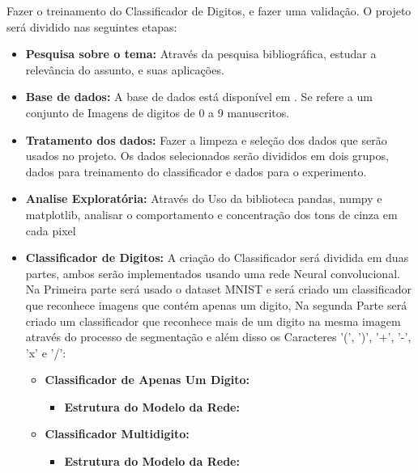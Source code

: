 \documentclass[conference]{IEEEtran}
\begin{document}
Fazer o treinamento do Classificador de Digitos, e fazer uma validação. O projeto será dividido nas seguintes etapas:


\begin{itemize}
\item \textbf{Pesquisa sobre o tema:}
Através da pesquisa bibliográfica, estudar  a relevância do assunto, e suas aplicações.


\item \textbf{Base de dados:}
A base de dados está disponível em \cite{b1}. Se refere a um conjunto de Imagens de digitos de 0 a 9 manuscritos.


\item \textbf{Tratamento dos dados:}
Fazer a limpeza e seleção dos dados que serão usados no projeto. Os dados selecionados serão divididos em dois grupos, dados para treinamento do classificador e dados para o experimento.


\item \textbf{Analise Exploratória:}
Através do Uso da biblioteca pandas, numpy e matplotlib, analisar o comportamento e concentração dos tons de cinza em cada pixel

\item \textbf{Classificador de Digitos:}
	A criação do Classificador será dividida em duas partes, ambos serão implementados usando uma rede Neural  convolucional. Na Primeira parte será usado o dataset MNIST \cite{b1} e será criado um classificador que reconhece imagens que contém apenas um digito, Na segunda Parte será criado um classificador que reconhece mais de um digito na mesma imagem através do processo de segmentação e além disso os Caracteres '(', ')', '+', '-', 'x' e '/':
	
	
    \begin{itemize}
        \item \textbf{Classificador de Apenas Um Digito:}
        
        \begin{itemize}       
        \item \textbf{Estrutura do Modelo da Rede:}
        \end{itemize}
        
        \item \textbf{Classificador Multidigito:}
        
        \begin{itemize}       
        \item \textbf{Estrutura do Modelo da Rede:}
        \end{itemize}
        

\end{itemize}
\end{itemize}
\end{document}
